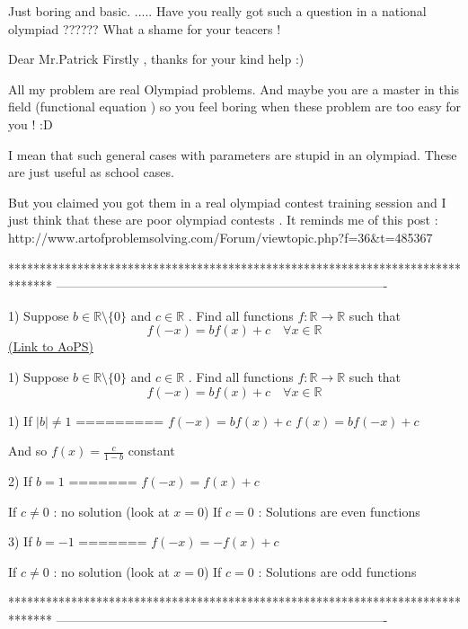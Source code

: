 \begin{solution}
	\begin{tcolorbox}

Just boring and basic.
.....
Have you really got such a question in a national olympiad ?????? What a shame for your teacers !\end{tcolorbox}

Dear Mr.Patrick 
Firstly , thanks for your kind help :)

All my problem are real Olympiad problems.  And maybe you are a master in this field (functional equation )  so you feel  boring when these problem are too easy for you ! :D
\end{solution}



\begin{solution}
	I mean that such general cases with parameters are stupid in an olympiad.
These are just useful as school cases.

But you claimed you got them in a real olympiad contest \/ training session and I just think that these are poor olympiad contests .
It reminds me of this post : http://www.artofproblemsolving.com/Forum/viewtopic.php?f=36&t=485367
\end{solution}
*******************************************************************************
-------------------------------------------------------------------------------

\begin{problem}
	1) Suppose $b\in\mathbb{R}\setminus \{0\}$ and $c\in\mathbb{R}$ . Find all functions $f:\mathbb{R}\to\mathbb{R}$ such that
\[f(-x)=bf(x)+c\quad \forall x\in\mathbb{R}\]
	\flushright \href{https://artofproblemsolving.com/community/c6h563896}{(Link to AoPS)}
\end{problem}



\begin{solution}
	\begin{tcolorbox}1) Suppose $b\in\mathbb{R}\setminus \{0\}$ and $c\in\mathbb{R}$ . Find all functions $f:\mathbb{R}\to\mathbb{R}$ such that
\[f(-x)=bf(x)+c\quad \forall x\in\mathbb{R}\]\end{tcolorbox}
1) If $|b|\ne 1$
=========
$f(-x)=bf(x)+c$
$f(x)=bf(-x)+c$

And so $f(x)=\frac c{1-b}$ constant

2) If $b=1$
=======
$f(-x)=f(x)+c$

If $c\ne 0$ : no solution (look at $x=0$)
If $c=0$ : Solutions are even functions

3) If $b=-1$
=======
$f(-x)=-f(x)+c$

If $c\ne 0$ : no solution (look at $x=0$)
If $c=0$ : Solutions are odd functions
\end{solution}
*******************************************************************************
-------------------------------------------------------------------------------

